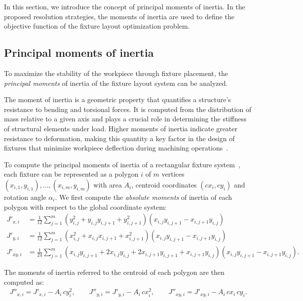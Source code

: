 \label{sec:backgorund}
In this section, we introduce the concept of principal moments of inertia. In the proposed resolution strategies, the moments of inertia are used to define the objective function of the fixture layout optimization problem.

\subsection{Principal moments of inertia}

To maximize the stability of the workpiece through fixture placement, the \textit{principal moments} of inertia of the fixture layout system can be analyzed.

The moment of inertia is a geometric property that quantifies a structure’s resistance to bending and torsional forces. It is computed from the distribution of mass relative to a given axis and plays a crucial role in determining the stiffness of structural elements under load. Higher moments of inertia indicate greater resistance to deformation, making this quantity a key factor in the design of fixtures that minimize workpiece deflection during machining operations~\cite{kalkan2013deflection,bischoff2011equivalent}.

To compute the principal moments of inertia of a rectangular fixture system~\cite{belluzzi1961scienza,coultas1925theory,hibbeler2006structural}, each fixture can be represented as a polygon $i$ of $m$ vertices $(x_{i,1}, y_{i,1}), \ldots, (x_{i,m}, y_{i,m})$ with area $A_i$, centroid coordinates $(cx_{i}, cy_{i})$ and rotation angle $\alpha_i$. We first compute the \textit{absolute moments} of inertia of each polygon with respect to the global coordinate system:
\begin{align*}
	J'_{x,i} 
	&= \tfrac{1}{12} \sum_{j=1}^{m} 
	(y_{i,j}^2 + y_{i,j}y_{i,j+1} + y_{i,j+1}^2)(x_{i,j}y_{i,j+1} - x_{i,j+1}y_{i,j}) \\
	J'_{y,i} 
	&= \tfrac{1}{12} \sum_{j=1}^{m} 
	(x_{i,j}^2 + x_{i,j}x_{i,j+1} + x_{i,j+1}^2) (x_{i,j}y_{i,j+1} - x_{i,j+1}y_{i,j}) \\
	J'_{xy,i} 
	&= \tfrac{1}{24} \sum_{j=1}^{m} 
	(x_{i,j}y_{i,j+1} + 2x_{i,j}y_{i,j} + 2x_{i,j+1}y_{i,j+1} + x_{i,j+1}y_{i,j}) (x_{i,j}y_{i,j+1} - x_{i,j+1}y_{i,j}).
\end{align*}

\noindent The moments of inertia referred to the centroid of each polygon are then computed as:
\begin{align*}
	J''_{x,i}  = J'_{x,i}  - A_i\,cy_{i}^2, \qquad
	J''_{y,i}  = J'_{y,i}  - A_i\,cx_{i}^2, \qquad
	J''_{xy,i} = J'_{xy,i} - A_i\,cx_{i}\,cy_{i}.
\end{align*}

